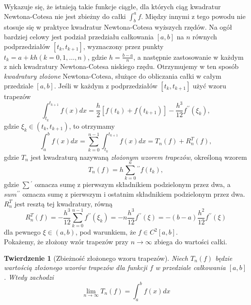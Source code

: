 \documentclass{article}
\newtheorem{twr}{Twierdzenie}
\begin{document}
Wykazuje się, że istnieją takie funkcje ciągłe, dla których ciąg kwadratur Newtona-Cotesa nie jest
zbieżny do całki $\int_b^a f$. Między innymi z tego powodu nie stosuje się w praktyce kwadratur Newtona-Cotesa wyższych
rzędów. Na ogół bardziej celowy jest podział przedziału całkowania $[a, b]$ na $n$ równych podprzedziałów
$[t_k, t_{k+1}]$, wyznaczony przez punkty $t_k = a + kh (k = 0, 1, \ldots , n)$, gdzie $h = \frac{b - a}{n}$, a następnie
zastosowanie w każdym z nich kwadratury Newtona-Cotesa niskiego rzędu. Otrzymujemy w ten sposób
\emph{kwadratury złożone} Newtona-Cotesa, służące do obliczania całki w całym przedziale $[a, b]$.
\newline
\newline
Jeśli w każdym z podprzedziałów $[t_k, t_{k+1}]$ użyć wzoru trapezów
\begin{equation*}
	\int_{t_k}^{t_{k + 1}} f(x) dx = \frac{h}{2}[f(t_k) + f(t_{k + 1})] - \frac{h^3}{12} f^{\prime\prime}(\xi_k),
\end{equation*}
gdzie $\xi_k \in (t_k,t_{k + 1})$, to otrzymamy
\begin{equation*}
	\int_a^b f(x) dx = \sum_{k = 0}^{n - 1} \int_{t_k}^{t_{k + 1}} f(x) dx = T_n(f) + R_n^T(f),
\end{equation*}
gdzie $T_n$ jest kwadraturą nazywaną \emph{złożonym wzorem trapezów}, określoną wzorem
\begin{equation*}
	T_n(f) = h {\sum_{k = 0}^n} {}^{\prime\prime} f(t_k),
\end{equation*}
gdzie $\sum {}^{\prime}$ oznacza sumę z pierwszym składnikiem podzielonym przez dwa, a $
sum {}^{\prime\prime}$ oznacza sumę z pierwszym i ostatnim składnikiem podzielonym przez dwa.
\newline
\newline
$R_n^T$ jest resztą tej kwadratury, równą
\begin{equation*}
	R_n^T(f) = -\frac{h^3}{12} \sum_{k = 0}^{n - 1} f^{\prime\prime}(\xi_k) = - n \frac{h^3}{12} f^{\prime\prime} (\xi) = -(b - a)\frac{h^2}{12} f^{\prime\prime} (\xi)
\end{equation*}
dla pewnego $\xi \in (a,b)$, pod warunkiem, że $f \in C^2[a,b]$.\\
Pokażemy, że złożony wzór trapezów przy $n \to \infty$ zbiega do wartości całki.
\begin{twr}[Zbieżność złożonego wzoru trapezów]
	\label{twr5}
	Niech $T_n(f)$ będzie wartością złożonego wzorów trapezów dla funkcji $f$ w przedziale całkowania $[a,b]$.
	Wtedy zachodzi
	\begin{equation*}
		\lim_{n \to \infty} T_n(f) = \int_a^b f(x) dx
	\end{equation*}
\end{twr}
\end{document}

